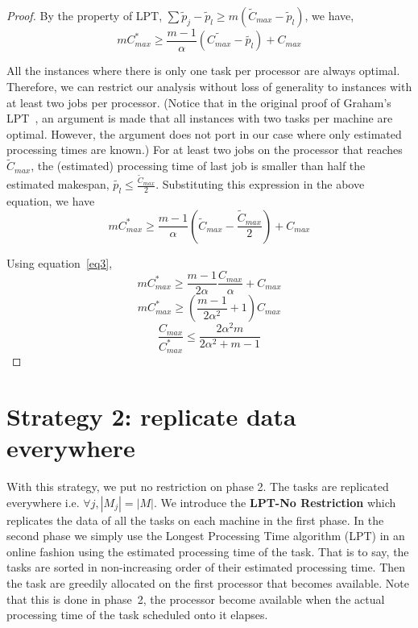 \documentclass[10pt, conference, compsocconf]{IEEEtran}
\begin{document}
\begin{proof}
 By the property of LPT, $\sum \tilde p_j-\tilde p_l \geq m (\tilde C_{max}-\tilde p_l)$, we have,
\begin{equation}\nonumber 
  m C_{max}^{*}\geq \frac{m-1}{\alpha } \left( \tilde{C_{max}} - \tilde{ p_l} \right) + {C_{max}}
 \end{equation}
 
 All the instances where there is only one task per processor are always
 optimal. Therefore, we can restrict our analysis without loss of
 generality to instances with at least two jobs per processor. (Notice
 that in the original proof of Graham's LPT~\cite{Graham69boundson},
 an argument is made that all instances with two tasks per machine are
 optimal. However, the argument does not port in our case where only
 estimated processing times are known.) For at least two jobs on the
 processor that reaches $\tilde{C}_{max}$, the (estimated)
 processing time of last job is smaller than half the estimated
 makespan, $\tilde{p_l} \leq \frac{\tilde{C}_{max}}{2}$. Substituting
 this expression in the above equation, we have
\begin{equation}\nonumber
 m C_{max}^{*}\geq \frac{m-1}{\alpha } \left( \tilde C_{max}-\frac{\tilde C_{max}}{2} \right ) + {C_{max}}
\end{equation}

Using equation~\ref{eq3},
\begin{equation}\nonumber
 m C_{max}^{*}\geq \frac{m-1}{2\alpha } \frac{C_{max}} {\alpha} + {C_{max}}
\end{equation}
\begin{equation}\nonumber
 m C_{max}^{*}\geq \left( \frac{m-1}{2\alpha^{2} } +1\right){C_{max}}
\end{equation}
\begin{equation}\nonumber
\frac{C_{max}}{C_{max}^{*}}\leq \frac{2\alpha^{2}m}{2\alpha^{2}+ m-1}
\end{equation}
\end{proof} 

\section{Strategy 2: replicate data everywhere}\label{sec5}

With this strategy, we put no restriction on phase 2. The tasks are
replicated everywhere i.e. $\forall j, |M_{j}|=|M|$. We introduce the
\textbf{LPT-No Restriction} which replicates the data of all the tasks
on each machine in the first phase. In the second phase we simply use
the Longest Processing Time algorithm (LPT) in an online fashion using
the estimated processing time of the task. That is to say, the tasks
are sorted in non-increasing order of their estimated processing
time. Then the task are greedily allocated on the first
processor that becomes available. Note that this is done in phase~2,
the processor become available when the actual processing time of
the task scheduled onto it elapses.
\end{document}
